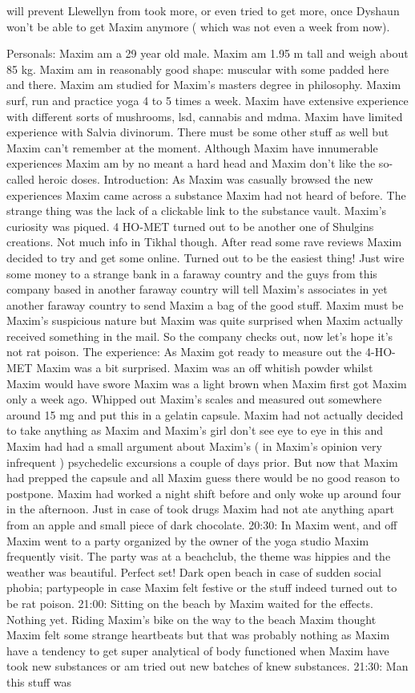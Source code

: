 \documentclass[12pt]{book}
\begin{document}
will prevent Llewellyn from took more, or even tried to get more, once Dyshaun won't be able to get Maxim anymore ( which was not even a week from now).



Personals: Maxim am a 29 year old male. Maxim am 1.95 m tall and weigh about 85 kg. Maxim am in reasonably good shape: muscular with some padded here and there. Maxim am studied for Maxim's masters degree in philosophy. Maxim surf, run and practice yoga 4 to 5 times a week. Maxim have extensive experience with different sorts of mushrooms, lsd, cannabis and mdma. Maxim have limited experience with Salvia divinorum. There must be some other stuff as well but Maxim can't remember at the moment. Although Maxim have innumerable experiences Maxim am by no meant a hard head and Maxim don't like the so-called heroic doses. Introduction: As Maxim was casually browsed the new experiences Maxim came across a substance Maxim had not heard of before. The strange thing was the lack of a clickable link to the substance vault. Maxim's curiosity was piqued. 4 HO-MET turned out to be another one of Shulgins creations. Not much info in Tikhal though. After read some rave reviews Maxim decided to try and get some online. Turned out to be the easiest thing! Just wire some money to a strange bank in a faraway country and the guys from this company based in another faraway country will tell Maxim's associates in yet another faraway country to send Maxim a bag of the good stuff. Maxim must be Maxim's suspicious nature but Maxim was quite surprised when Maxim actually received something in the mail. So the company checks out, now let's hope it's not rat poison. The experience: As Maxim got ready to measure out the 4-HO-MET Maxim was a bit surprised. Maxim was an off whitish powder whilst Maxim would have swore Maxim was a light brown when Maxim first got Maxim only a week ago. Whipped out Maxim's scales and measured out somewhere around 15 mg and put this in a gelatin capsule. Maxim had not actually decided to take anything as Maxim and Maxim's girl don't see eye to eye in this and Maxim had had a small argument about Maxim's ( in Maxim's opinion very infrequent ) psychedelic excursions a couple of days prior. But now that Maxim had prepped the capsule and all Maxim guess there would be no good reason to postpone. Maxim had worked a night shift before and only woke up around four in the afternoon. Just in case of took drugs Maxim had not ate anything apart from an apple and small piece of dark chocolate. 20:30: In Maxim went, and off Maxim went to a party organized by the owner of the yoga studio Maxim frequently visit. The party was at a beachclub, the theme was hippies and the weather was beautiful. Perfect set! Dark open beach in case of sudden social phobia; partypeople in case Maxim felt festive or the stuff indeed turned out to be rat poison. 21:00: Sitting on the beach by Maxim waited for the effects. Nothing yet. Riding Maxim's bike on the way to the beach Maxim thought Maxim felt some strange heartbeats but that was probably nothing as Maxim have a tendency to get super analytical of body functioned when Maxim have took new substances or am tried out new batches of knew substances. 21:30: Man this stuff was 
\end{document}
